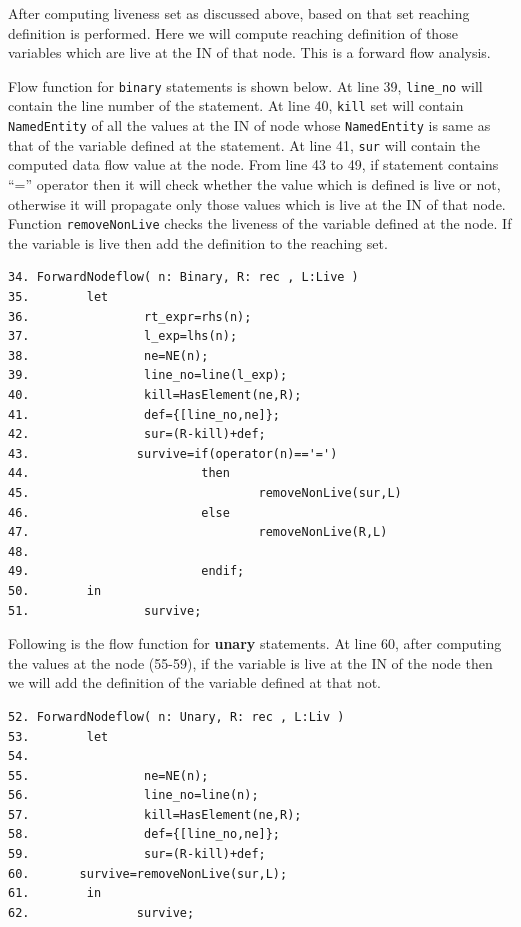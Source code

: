 \documentclass[11pt,a4paper,openright]{report}
\begin{document}
After computing liveness set as discussed above, based on that set reaching definition is performed. Here we will compute reaching definition of those
variables which are live at the IN of that node. This is a forward flow analysis.

Flow function for \texttt{binary} statements is shown below. At line 39, \texttt{line\_no} will contain the line number of the statement. At line 40,
\texttt{kill} set will contain \texttt{NamedEntity} of all the values at the IN of node whose \texttt{NamedEntity} is same as that of the variable defined at the statement.
At line 41, \texttt{sur} will contain the computed data flow value at the node. From line 43 to 49, if statement contains ``='' operator then it will 
check whether the value which is defined is live or not, otherwise it will propagate only those values which is live at the IN of that node. Function
\texttt{removeNonLive} checks the liveness of the variable defined at the node. If the variable is live then add the definition to the reaching set.

\begin{lstlisting}
34. ForwardNodeflow( n: Binary, R: rec , L:Live )
35.        let
36.                rt_expr=rhs(n);
37.                l_exp=lhs(n);
38.                ne=NE(n);
39.                line_no=line(l_exp);
40.                kill=HasElement(ne,R);
41.                def={[line_no,ne]};
42.                sur=(R-kill)+def;
43.               survive=if(operator(n)=='=')
44.                        then
45.                                removeNonLive(sur,L)
46.                        else
47.                                removeNonLive(R,L)
48.
49.                        endif;
50.        in
51.                survive;
\end{lstlisting}

Following is the flow function for \textbf{unary} statements. At line 60, after computing the values at the node (55-59), if the variable is live at the IN of the node
then we will add the definition of the variable defined at that not. 

\begin{lstlisting}
52. ForwardNodeflow( n: Unary, R: rec , L:Liv )
53.        let
54.                
55.                ne=NE(n);
56.                line_no=line(n);
57.                kill=HasElement(ne,R);
58.                def={[line_no,ne]};
59.                sur=(R-kill)+def;
60.		  survive=removeNonLive(sur,L);
61.        in
62.               survive;

\end{lstlisting}
\end{document}
